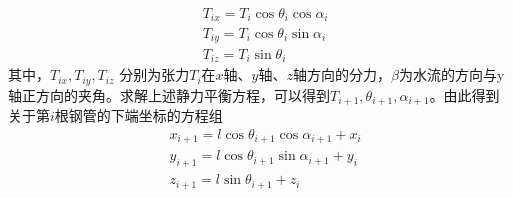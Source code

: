 \documentclass[UTF8]{ctexbook}
\theoremstyle{nonumberplain}
\begin{document}
            \begin{align*}
            & T_{ix} = T_i\cos\theta_i\cos\alpha_i\\
            & T_{iy} = T_i\cos\theta_i\sin\alpha_i\\
            & T_{iz} = T_i\sin\theta_i
            \end{align*}
            其中，$T_{ix},T_{iy},T_{iz}$ 分别为张力$T_i$在$x$轴、$y$轴、$z$轴方向的分力，$\beta$为水流的方向与y轴正方向的夹角。求解上述静力平衡方程，可以得到$T_{i+1},\theta_{i+1},\alpha_{i+1}$。由此得到关于第$i$根钢管的下端坐标的方程组
            \begin{align*}
            & x_{i+1} = l\cos\theta_{i+1}\cos\alpha_{i+1}+x_i\\
            & y_{i+1} = l\cos\theta_{i+1}\sin\alpha_{i+1}+y_i\\
            & z_{i+1} = l\sin \theta_{i+1}+z_i
            \end{align*}
\end{document}
